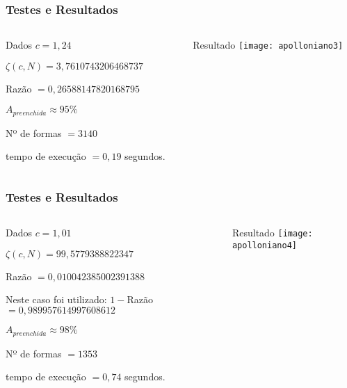\documentclass[aspectratio=169,11pt,red]{beamer}
\begin{document}
\begin{frame}
\frametitle{Testes e Resultados}
\begin{columns}[T]
\begin{column}{.5\textwidth}
\begin{block}{\centering Dados}
$c=1,24$
\smallskip

$\zeta(c,N)=3,7610743206468737$
\smallskip

Razão $=0,26588147820168795$
\smallskip

$A_{preenchida} \approx 95\%$
\smallskip

Nº de formas $=3140$
\smallskip

tempo de execução $= 0,19$ segundos.
\smallskip
\end{block}
\end{column}

\begin{column}{.5\textwidth}
\begin{block}{\centering Resultado}
\centering
\texttt{[image: apolloniano3]}
\end{block}
\end{column}
\end{columns}
\end{frame}

\begin{frame}
\frametitle{Testes e Resultados}
\begin{columns}[T]
\begin{column}{.5\textwidth}
\begin{block}{\centering Dados}
$c=1,01$

\smallskip
$\zeta(c,N)=99,5779388822347$
\smallskip

Razão $=0,010042385002391388$
\smallskip

Neste caso foi utilizado: $1-$Razão$=0,989957614997608612$
\smallskip

$A_{preenchida} \approx 98\%$
\smallskip

Nº de formas $=1353$
\smallskip

tempo de execução $=0,74$ segundos.
\smallskip
\end{block}
\end{column}

\begin{column}{.5\textwidth}
\begin{block}{\centering Resultado}
\centering
\texttt{[image: apolloniano4]}
\end{block}
\end{column}
\end{columns}
\end{frame}
\end{document}
